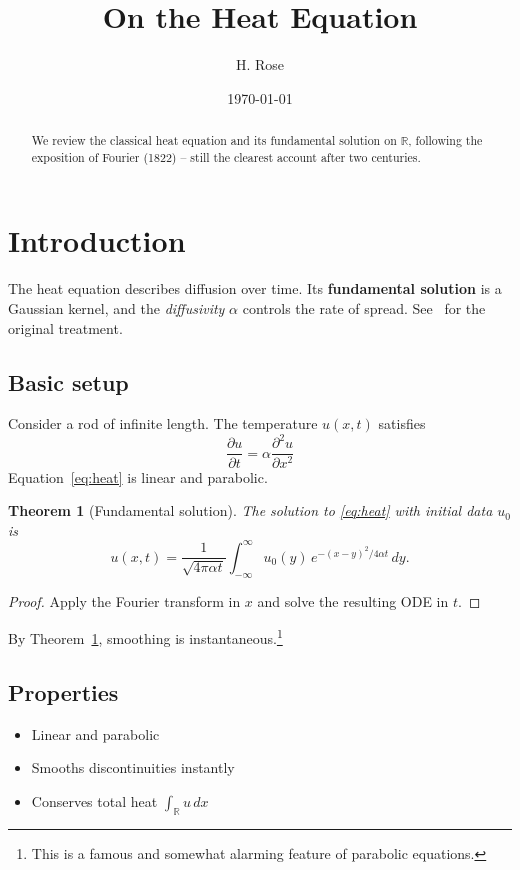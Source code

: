 \documentclass{article}
\title{On the Heat Equation}
\author{H. Rose}
\date{\today}
\newcommand{\R}{\mathbb{R}}
\newtheorem{theorem}{Theorem}
\begin{document}
\maketitle

\begin{abstract}
We review the classical heat equation and its fundamental solution on $\R$, following the exposition of Fourier (1822) -- still the clearest account after two centuries.
\end{abstract}

\section{Introduction}
The heat equation describes diffusion over time. Its \textbf{fundamental solution} is a Gaussian kernel, and the \emph{diffusivity} $\alpha$ controls the rate of spread. See~\cite{fourier1822} for the original treatment.

\subsection{Basic setup}
Consider a rod of infinite length. The temperature $u(x,t)$ satisfies
\begin{equation}
\label{eq:heat}
\frac{\partial u}{\partial t} = \alpha \frac{\partial^2 u}{\partial x^2}
\end{equation}
Equation~\eqref{eq:heat} is linear and parabolic.

\begin{theorem}[Fundamental solution]
\label{thm:fund}
The solution to \eqref{eq:heat} with initial data $u_0$ is
$$u(x,t) = \frac{1}{\sqrt{4\pi\alpha t}} \int_{-\infty}^{\infty} u_0(y)\, e^{-(x-y)^2/4\alpha t}\, dy.$$
\end{theorem}

\begin{proof}
Apply the Fourier transform in $x$ and solve the resulting ODE in $t$.
\end{proof}

By Theorem~\ref{thm:fund}, smoothing is instantaneous.\footnote{This is a famous and somewhat alarming feature of parabolic equations.}

\subsection{Properties}
\begin{itemize}
  \item Linear and parabolic
  \item Smooths discontinuities instantly
  \item Conserves total heat $\int_\R u\,dx$
\end{itemize}
\end{document}

